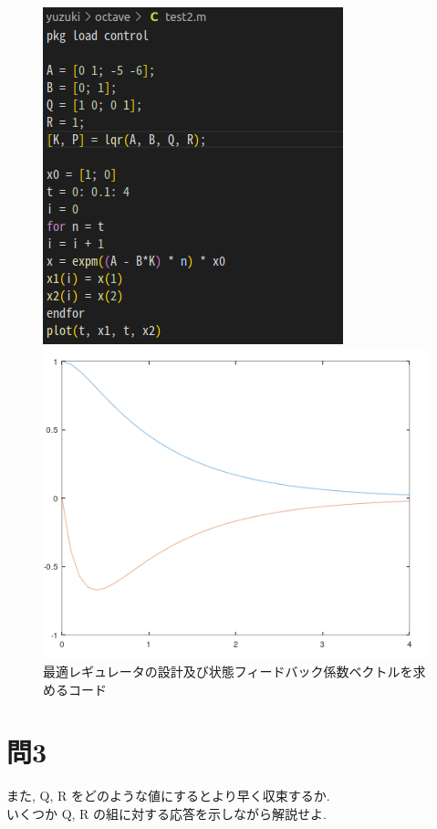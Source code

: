 \documentclass{jsarticle}
\begin{document}
\begin{figure}[htbp]
  \begin{minipage}[t]{0.5\linewidth}
    \centering
    \includegraphics[keepaspectratio, scale=0.485]{fig/ato_c.png}
  \end{minipage}
  \begin{minipage}[t]{0.5\linewidth}
    \centering
    \includegraphics[keepaspectratio, scale=0.48]{fig/ato_r.png}
  \end{minipage}\vspace*{2mm}
  \caption{最適レギュレータの設計及び状態フィードバック係数ベクトルを求めるコード}
\end{figure}



\section*{問3}
また, Q, R をどのような値にするとより早く収束するか.\\
\hspace*{1zw}いくつか Q, R の組に対する応答を示しながら解説せよ.





\end{document}
